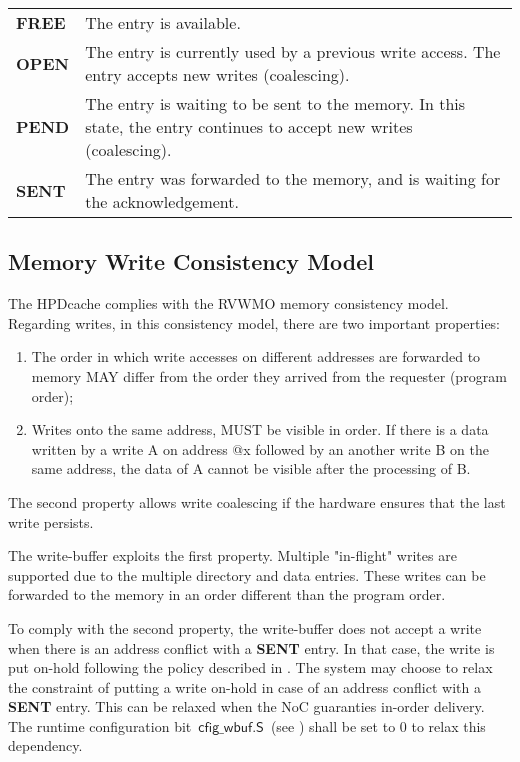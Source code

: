 \documentclass[10pt,titlepage,twoside]{book}
\begin{document}
\begin{center}
\begin{tabular}{lp{.8\linewidth}}
\textbf{FREE} & The entry is available.\\
\textbf{OPEN} & The entry is currently used by a previous write access. The entry accepts new writes (coalescing).\\
\textbf{PEND} & The entry is waiting to be sent to the memory. In this state, the entry continues to accept new writes (coalescing).\\
\textbf{SENT} & The entry was forwarded to the memory, and is waiting for the acknowledgement.\\
\end{tabular}
\end{center}

\subsection{Memory Write Consistency Model}

The \ac{HPDcache} complies with the \ac{RVWMO} memory consistency model.
Regarding writes, in this consistency model, there are two important properties:

\begin{enumerate}

\item The order in which write accesses on different addresses are forwarded to memory MAY differ from the order they arrived from the requester (program order);

\item Writes onto the same address, MUST be visible in order. If there is a data written by a write A on address @x followed by an another write B on the same address, the data of A cannot be visible after the processing of B.

\end{enumerate}

The second property allows write coalescing if the hardware ensures that the last write persists.

The write-buffer exploits the first property.
Multiple "in-flight" writes are supported due to the multiple directory and data entries.
These writes can be forwarded to the memory in an order different than the program order.

To comply with the second property, the write-buffer does not accept a write when there is an address conflict with a \textbf{SENT} entry.
In that case, the write is put on-hold following the policy described in .
The system may choose to relax the constraint of putting a write on-hold in case of an address conflict with a \textbf{SENT} entry.
This can be relaxed when the \ac{NoC} guaranties in-order delivery.
The runtime configuration bit~$\mathsf{cfig\_wbuf.S}$~(see ) shall be set to 0 to relax this dependency.
\end{document}
